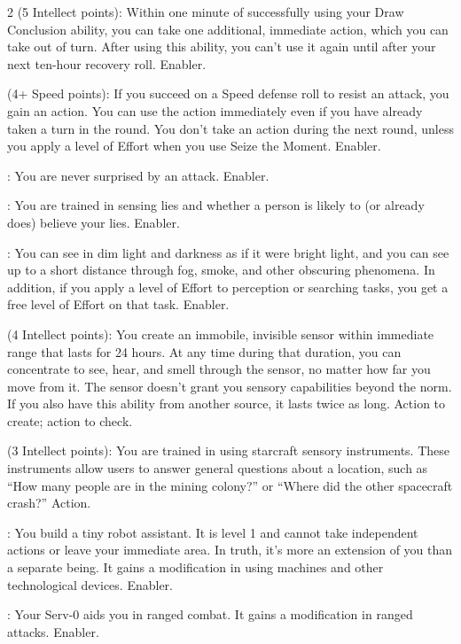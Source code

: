\begin{multicols}{2}
 (5 Intellect points): Within one minute of successfully using your Draw Conclusion ability, you can take one additional, immediate action, which you can take out of turn. After using this ability, you can’t use it again until after your next ten-hour recovery roll. Enabler. 
 
 (4+ Speed points): If you succeed on a Speed defense roll to resist an attack, you gain an action. You can use the action immediately even if you have already taken a turn in the round. You don’t take an action during the next round, unless you apply a level of Effort when you use Seize the Moment. Enabler. 
 
: You are never surprised by an attack. Enabler. 
 
: You are trained in sensing lies and whether a person is likely to (or already does) believe your lies. Enabler.
 
: You can see in dim light and darkness as if it were bright light, and you can see up to a short distance through fog, smoke, and other obscuring phenomena. In addition, if you apply a level of Effort to perception or searching tasks, you get a free level of Effort on that task. Enabler.
 
 (4 Intellect points): You create an immobile, invisible sensor within immediate range that lasts for 24 hours. At any time during that duration, you can concentrate to see, hear, and smell through the sensor, no matter how far you move from it. The sensor doesn’t grant you sensory capabilities beyond the norm. If you also have this ability from another source, it lasts twice as long. Action to create; action to check. 
 
 (3 Intellect points): You are trained in using starcraft sensory instruments. These instruments allow users to answer general questions about a location, such as “How many people are in the mining colony?” or “Where did the other spacecraft crash?” Action. 
 
: You build a tiny robot assistant. It is level 1 and cannot take independent actions or leave your immediate area. In truth, it’s more an extension of you than a separate being. It gains a modification in using machines and other technological devices. Enabler.
 
: Your Serv-0 aids you in ranged combat. It gains a modification in ranged attacks. Enabler. 
 

\end{multicols}
